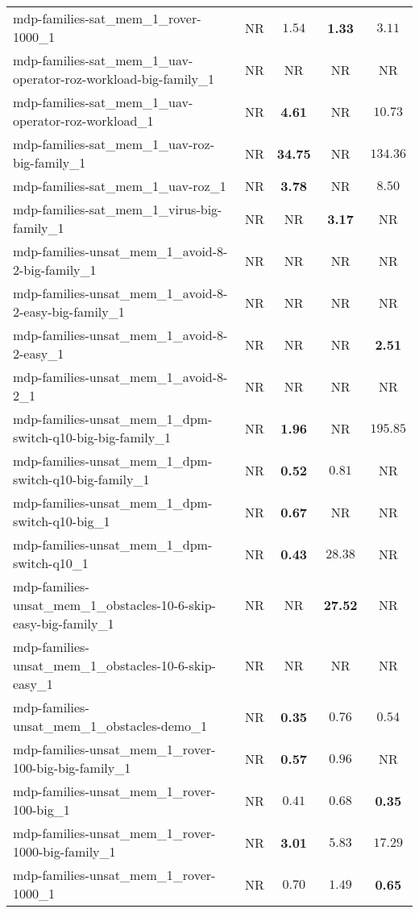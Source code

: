 \begin{tabular}{lcccc}
mdp-families-sat\_mem\_1\_rover-1000\_1 & NR & $1.54$ & \textbf{1.33} & $3.11$ \\
mdp-families-sat\_mem\_1\_uav-operator-roz-workload-big-family\_1 & NR & NR & NR & NR \\
mdp-families-sat\_mem\_1\_uav-operator-roz-workload\_1 & NR & \textbf{4.61} & NR & $10.73$ \\
mdp-families-sat\_mem\_1\_uav-roz-big-family\_1 & NR & \textbf{34.75} & NR & $134.36$ \\
mdp-families-sat\_mem\_1\_uav-roz\_1 & NR & \textbf{3.78} & NR & $8.50$ \\
mdp-families-sat\_mem\_1\_virus-big-family\_1 & NR & NR & \textbf{3.17} & NR \\
mdp-families-unsat\_mem\_1\_avoid-8-2-big-family\_1 & NR & NR & NR & NR \\
mdp-families-unsat\_mem\_1\_avoid-8-2-easy-big-family\_1 & NR & NR & NR & NR \\
mdp-families-unsat\_mem\_1\_avoid-8-2-easy\_1 & NR & NR & NR & \textbf{2.51} \\
mdp-families-unsat\_mem\_1\_avoid-8-2\_1 & NR & NR & NR & NR \\
mdp-families-unsat\_mem\_1\_dpm-switch-q10-big-big-family\_1 & NR & \textbf{1.96} & NR & $195.85$ \\
mdp-families-unsat\_mem\_1\_dpm-switch-q10-big-family\_1 & NR & \textbf{0.52} & $0.81$ & NR \\
mdp-families-unsat\_mem\_1\_dpm-switch-q10-big\_1 & NR & \textbf{0.67} & NR & NR \\
mdp-families-unsat\_mem\_1\_dpm-switch-q10\_1 & NR & \textbf{0.43} & $28.38$ & NR \\
mdp-families-unsat\_mem\_1\_obstacles-10-6-skip-easy-big-family\_1 & NR & NR & \textbf{27.52} & NR \\
mdp-families-unsat\_mem\_1\_obstacles-10-6-skip-easy\_1 & NR & NR & NR & NR \\
mdp-families-unsat\_mem\_1\_obstacles-demo\_1 & NR & \textbf{0.35} & $0.76$ & $0.54$ \\
mdp-families-unsat\_mem\_1\_rover-100-big-big-family\_1 & NR & \textbf{0.57} & $0.96$ & NR \\
mdp-families-unsat\_mem\_1\_rover-100-big\_1 & NR & $0.41$ & $0.68$ & \textbf{0.35} \\
mdp-families-unsat\_mem\_1\_rover-1000-big-family\_1 & NR & \textbf{3.01} & $5.83$ & $17.29$ \\
mdp-families-unsat\_mem\_1\_rover-1000\_1 & NR & $0.70$ & $1.49$ & \textbf{0.65} \\

\end{tabular}
